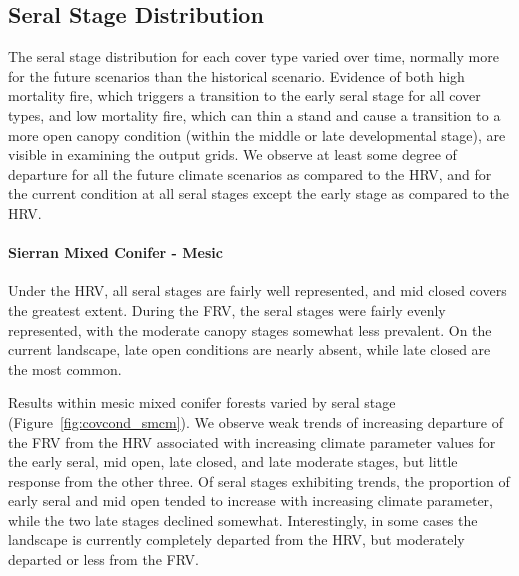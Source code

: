 \documentclass[12pt]{article}
\begin{document}
\begin{spacing}{1}
\subsection*{Seral Stage Distribution}
The seral stage distribution for each cover type varied over time, normally more for the future scenarios than the historical scenario. Evidence of both high mortality fire, which triggers a transition to the early seral stage for all cover types, and low mortality fire, which can thin a stand and cause a transition to a more open canopy condition (within the middle or late developmental stage), are visible in examining the output grids. We observe at least some degree of departure for all the future climate scenarios as compared to the HRV, and for the current condition at all seral stages except the early stage as compared to the HRV. 




\paragraph{Sierran Mixed Conifer - Mesic} 
Under the HRV, all seral stages are fairly well represented, and mid closed covers the greatest extent. During the FRV, the seral stages were fairly evenly represented, with the moderate canopy stages somewhat less prevalent. On the current landscape, late open conditions are nearly absent, while late closed are the most common.

Results within mesic mixed conifer forests varied by seral stage (Figure~\ref{fig:covcond_smcm}). We observe weak trends of increasing departure of the FRV from the HRV associated with increasing climate parameter values for the early seral, mid open, late closed, and late moderate stages, but little response from the other three. Of seral stages exhibiting trends, the proportion of early seral and mid open tended to increase with increasing climate parameter, while the two late stages declined somewhat. Interestingly, in some cases the landscape is currently completely departed from the HRV, but moderately departed or less from the FRV.




\end{spacing}
\end{document}
